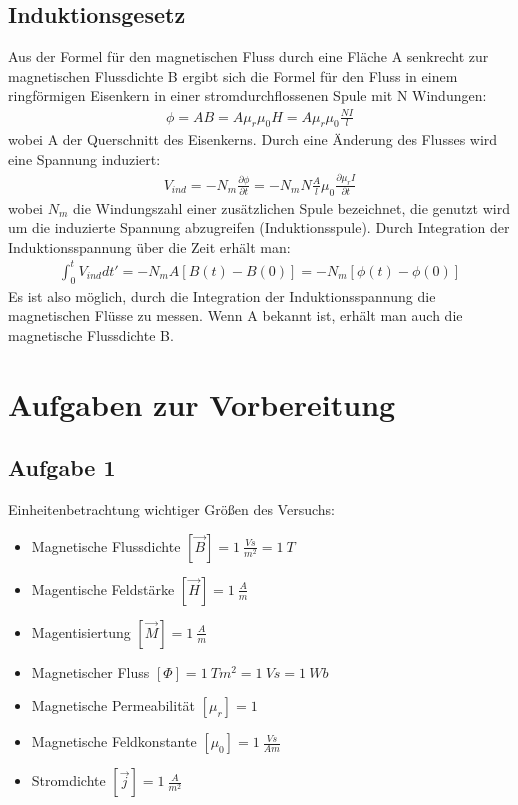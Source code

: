 \documentclass[a4paper,10pt]{scrartcl}
\begin{document}
		\newpage
		
	\subsection{Induktionsgesetz}
	
		Aus der Formel für den magnetischen Fluss durch eine Fläche A senkrecht zur magnetischen Flussdichte B ergibt sich die Formel für den Fluss in einem ringförmigen Eisenkern in einer stromdurchflossenen Spule mit N Windungen:
		\begin{align}
		\phi=AB=A\mu_{r}\mu_{0}H=A\mu_{r}\mu_{0}\frac{NI}{l}
		\end{align}
		wobei A der Querschnitt des Eisenkerns. Durch eine Änderung des Flusses wird eine Spannung induziert:
		\begin{align}
		V_{ind}=-N_{m}\frac{\partial \phi}{\partial t}=-N_{m}N\frac{A}{l}\mu_{0}\frac{\partial \mu_{r}I}{\partial t}
		\end{align}
		wobei \(N_{m}\) die Windungszahl einer zusätzlichen Spule bezeichnet, die genutzt wird um die induzierte Spannung abzugreifen (Induktionsspule). Durch Integration der Induktionsspannung über die Zeit erhält man:
		\begin{align}
		\int_{0}^{t}V_{ind}dt'=-N_{m}A[B(t)-B(0)]=-N_{m}[\phi(t)-\phi(0)]
		\end{align}
		Es ist also möglich, durch die Integration der Induktionsspannung die magnetischen Flüsse zu messen. Wenn A bekannt ist, erhält man auch die magnetische Flussdichte B.
	
	

\section{Aufgaben zur Vorbereitung}

\subsection{Aufgabe 1}
Einheitenbetrachtung wichtiger Größen des Versuchs:
\begin{itemize}
	\item Magnetische Flussdichte $[\vec{B}]=1~\frac{Vs}{m^2}=1~T$
	\item Magentische Feldstärke $[\vec{H}]=1~\frac{A}{m}$
	\item Magentisiertung $[\vec{M}]=1~\frac{A}{m}$
	\item Magnetischer Fluss $[\Phi]=1~Tm^2=1~Vs=1~Wb$
	\item Magnetische Permeabilität $[\mu_r]=1$
	\item Magnetische Feldkonstante $[\mu_0]=1~\frac{Vs}{Am}$ 
	\item Stromdichte $[\vec{j}]=1~\frac{A}{m^2}$
\end{itemize} 
\end{document}
